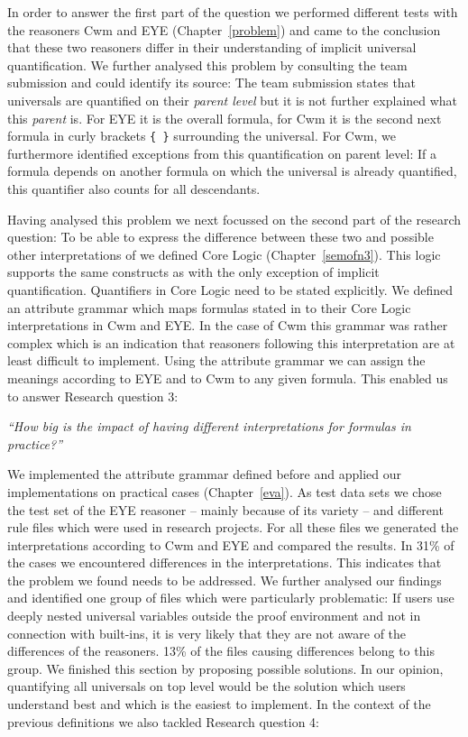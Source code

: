 In order to answer the first part of the question we performed different tests with the reasoners Cwm and EYE (Chapter~\ref{problem}) and came to the conclusion 
that these two reasoners differ in their understanding of implicit universal quantification. We further analysed this problem by consulting the 
\wwwc team submission and could identify its source: The team submission states that universals are quantified on their \emph{parent level} 
but it is not further explained what this \emph{parent} is. For EYE it is the overall formula, for Cwm it is the second next formula in curly brackets
\texttt{\{ \}} surrounding the universal. For Cwm, we furthermore identified exceptions from this quantification on parent level: If a formula depends on another formula 
on which the universal is already quantified, this quantifier also counts for all descendants. 

Having analysed this problem we next focussed on the second part of the research question: To be able to express the difference between these two 
and possible other 
interpretations of \nthree we defined \nthree Core Logic (Chapter~\ref{semofn3}).
This logic supports the same constructs as \nthreelogic with the only exception of implicit quantification. Quantifiers in \nthree Core Logic need to be stated explicitly.
We defined an attribute grammar which maps formulas stated in \nthree to their \nthree Core Logic interpretations in Cwm and EYE. In the case of Cwm 
this grammar was rather complex which is an indication that reasoners following this interpretation are at least difficult to implement.
Using the attribute grammar we can assign the meanings according to EYE and to Cwm to any given \nthree formula. This enabled us to answer Research question 3:

\emph{``How big is the impact of having different interpretations for \nthree formulas in practice?''}

We implemented the attribute grammar defined before and applied our implementations on practical cases (Chapter~\ref{eva}). As test data sets we chose
the test set of the EYE reasoner -- mainly because of its variety -- and different 
rule files which were used in research projects. For all these files we generated the interpretations according to Cwm and EYE and compared the results. In 31\%
of the cases we encountered differences in the interpretations. This indicates that the problem we found needs to be addressed. We further analysed our findings and 
identified one group of files which were particularly problematic: If users use deeply nested universal variables outside the proof environment and 
not in connection with built-ins, it is very likely that they are not aware of the differences of the reasoners. 
13\% of the files causing differences belong to this group. We finished this section by proposing possible solutions. In our opinion, 
quantifying all universals on top level would be the solution which users understand best and which is the easiest to implement. In the context of the previous 
definitions we also tackled Research question 4:

